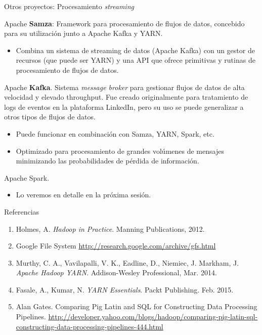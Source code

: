 \begin{frame}{Otros proyectos: Procesamiento \textit{streaming}}
  \begin{wideitemize}
    \item Apache \textbf{Samza}: Framework para procesamiento de flujos de datos,
     concebido para su utilización junto a Apache Kafka y YARN.
    \begin{itemize}
     \item Combina un sistema de streaming de datos (Apache Kafka) con un gestor
     de recursos (que puede ser YARN) y una API que ofrece primitivas y rutinas
     de procesamiento de flujos de datos.
    \end{itemize}
    
    \item Apache \textbf{Kafka}. Sistema \textit{message broker} para gestionar 
     flujos de datos de alta velocidad y elevado throughput. Fue creado originalmente
     para tratamiento de logs de eventos en la plataforma LinkedIn, pero su uso
     se puede generalizar a otros tipos de flujos de datos.
     \begin{itemize}
     \item Puede funcionar en combinación con Samza, YARN, Spark, etc.
     \item Optimizado para procesamiento de grandes volúmenes de mensajes minimizando
     las probabilidades de pérdida de información.
    \end{itemize}
    
    \item Apache Spark.
    \begin{itemize}
     \item Lo veremos en detalle en la próxima sesión.
    \end{itemize}
      
    \end{wideitemize}

\end{frame}


\begin{frame}{Referencias}
 \begin{enumerate}
  \item Holmes, A. \textit{Hadoop in Practice}. Manning Publications, 2012.
  \item Google File System \url{http://research.google.com/archive/gfs.html}
  \item Murthy, C. A., Vavilapalli, V. K., Eadline, D., Niemiec, J. Markham, J.
  \textit{Apache Hadoop YARN}. Addison-Wesley Professional, Mar. 2014.
  \item Fasale, A., Kumar, N. \textit{YARN Essentials}. Packt Publishing. Feb. 2015. 
  \item  Alan Gates. Comparing Pig Latin and SQL for Constructing Data Processing 
 Pipelines.
 \url{http://developer.yahoo.com/blogs/hadoop/comparing-pig-latin-sql-constructing-data-processing-pipelines-444.html}
 \end{enumerate}

\end{frame}

